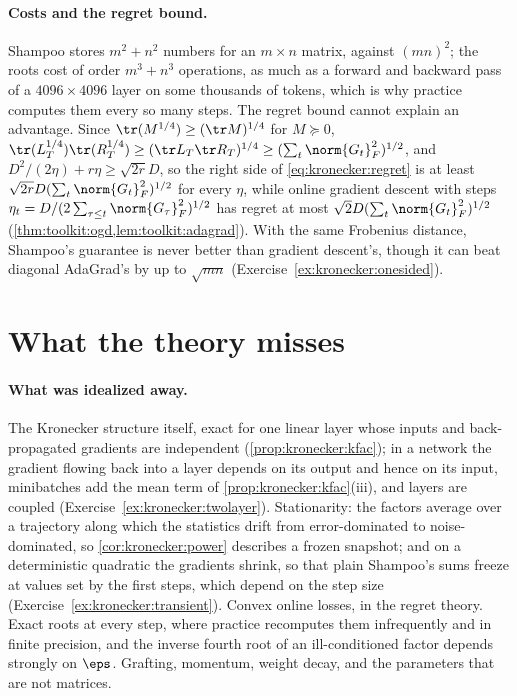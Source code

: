 \begin{refsection}
\paragraph{Costs and the regret bound.} Shampoo stores $m^2+n^2$ numbers for an $m\times n$ matrix, against $(mn)^2$; the roots cost of order $m^3+n^3$ operations, as much as a forward and backward pass of a $4096\times4096$ layer on some thousands of tokens, which is why practice computes them every so many steps. The regret bound cannot explain an advantage. Since $\tr(M^{1/4})\ge(\tr M)^{1/4}$ for $M\succeq0$, $\tr(L_T^{1/4})\tr(R_T^{1/4})\ge(\tr L_T\tr R_T)^{1/4}\ge(\sum_t\norm{G_t}_F^2)^{1/2}$, and $D^2/(2\eta)+r\eta\ge\sqrt{2r}D$, so the right side of \eqref{eq:kronecker:regret} is at least $\sqrt{2r}D(\sum_t\norm{G_t}_F^2)^{1/2}$ for every $\eta$, while online gradient descent with steps $\eta_t=D/(2\sum_{\tau\le t}\norm{G_\tau}_F^2)^{1/2}$ has regret at most $\sqrt2D(\sum_t\norm{G_t}_F^2)^{1/2}$ (\cref{thm:toolkit:ogd,lem:toolkit:adagrad}). With the same Frobenius distance, Shampoo's guarantee is never better than gradient descent's, though it can beat diagonal AdaGrad's by up to $\sqrt{mn}$ (Exercise~\ref{ex:kronecker:onesided}).

\section{What the theory misses}\label{sec:kronecker:misses}

\paragraph{What was idealized away.} The Kronecker structure itself, exact for one linear layer whose inputs and back-propagated gradients are independent (\cref{prop:kronecker:kfac}); in a network the gradient flowing back into a layer depends on its output and hence on its input, minibatches add the mean term of \cref{prop:kronecker:kfac}(iii), and layers are coupled (Exercise~\ref{ex:kronecker:twolayer}). Stationarity: the factors average over a trajectory along which the statistics drift from error-dominated to noise-dominated, so \cref{cor:kronecker:power} describes a frozen snapshot; and on a deterministic quadratic the gradients shrink, so that plain Shampoo's sums freeze at values set by the first steps, which depend on the step size (Exercise~\ref{ex:kronecker:transient}). Convex online losses, in the regret theory. Exact roots at every step, where practice recomputes them infrequently and in finite precision, and the inverse fourth root of an ill-conditioned factor depends strongly on $\eps$. Grafting, momentum, weight decay, and the parameters that are not matrices.


\end{refsection}
